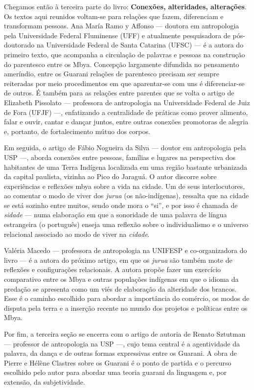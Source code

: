 Chegamos então à terceira parte do livro: \textbf{Conexões, alteridades,
alterações}. Os textos aqui reunidos voltam-se para relações que fazem,
diferenciam e transformam pessoas. Ana María Ramo y Affonso --- doutora
em antropologia pela Universidade Federal Fluminense (UFF) e atualmente
pesquisadora de pós-doutorado na Universidade Federal de Santa Catarina
(UFSC) --- é a autora do primeiro texto, que acompanha a circulação de
palavras e pessoas na construção do parentesco entre os Mbya. Concepção
largamente difundida no pensamento ameríndio, entre os Guarani relações
de parentesco precisam ser sempre reiteradas por meio procedimentos em
que aparentar-se com uns é diferenciar-se de outros. É também para as
relações entre parentes que se volta o artigo de Elizabeth Pissolato ---
professora de antropologia na Universidade Federal de Juiz de Fora
(UFJF) ---, enfatizando a centralidade de práticas como prover alimento,
falar e ouvir, cantar e dançar juntos, entre outras conexões promotoras
de alegria e, portanto, de fortalecimento mútuo dos corpos.

Em seguida, o artigo de Fábio Nogueira da Silva --- doutor em
antropologia pela USP ---, aborda conexões entre pessoas, famílias e
lugares na perspectiva dos habitantes de uma Terra Indígena localizada
em uma região bastante urbanizada da capital paulista, vizinha ao Pico
do Jaraguá. O autor discorre sobre experiências e reflexões mbya sobre a
vida na cidade. Um de seus interlocutores, ao comentar o modo de viver
dos \emph{jurua} (os não-indígenas), ressalta que na cidade se está
sozinho entre muitos, sendo onde mora o ``si'', e por isso é chamada de
\emph{sidade} --- numa elaboração em que a sonoridade de uma palavra de
língua estrangeira (o português) enseja uma reflexão sobre o
individualismo e o universo relacional associado ao modo de viver na
\emph{cidade}.

Valéria Macedo --- professora de antropologia na UNIFESP e
co-organizadora do livro --- é a autora do próximo artigo, em que os
\emph{jurua} são também mote de reflexões e configurações relacionais. A
autora propõe fazer um exercício comparativo entre os Mbya e outras
populações indígenas em que o idioma da predação se apresenta como um
viés de elaboração da alteridade dos brancos. Esse é o caminho escolhido
para abordar a importância do comércio, os modos de disputa pela terra e
a inserção recente no mundo dos projetos e políticas entre os Mbya.

Por fim, a terceira seção se encerra com o artigo de autoria de Renato
Sztutman --- professor de antropologia na USP ---, cujo tema central é a
agentividade da palavra, da dança e de outras formas expressivas entre
os Guarani. A obra de Pierre e Hélène Clastres sobre os Guarani é o
ponto de partida e o percurso escolhido pelo autor para abordar uma
teoria guarani da linguagem e, por extensão, da subjetividade.

